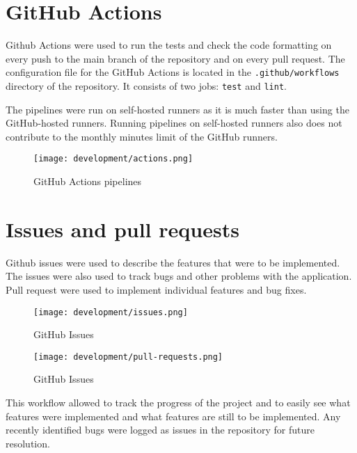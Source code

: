 \documentclass[../main.tex]{subfiles}
\begin{document}
\section{GitHub Actions}

Github Actions were used to run the tests and check the code formatting on every push to the main branch of the repository and on every pull request.
The configuration file for the GitHub Actions is located in the \texttt{.github/workflows} directory of the repository.
It consists of two jobs: \texttt{test} and \texttt{lint}.

The pipelines were run on self-hosted runners as it is much faster than using the GitHub-hosted runners.
Running pipelines on self-hosted runners also does not contribute to the monthly minutes limit of the GitHub runners.

\begin{figure}[H]
  \centering
  \texttt{[image: development/actions.png]}
  \caption{GitHub Actions pipelines}
\end{figure}

\section{Issues and pull requests}

Github issues were used to describe the features that were to be implemented. The issues were also used to track bugs and other problems with the application.
Pull request were used to implement individual features and bug fixes.

\begin{figure}[H]
  \centering
  \texttt{[image: development/issues.png]}
  \caption{GitHub Issues}
\end{figure}

\begin{figure}[H]
  \centering
  \texttt{[image: development/pull-requests.png]}
  \caption{GitHub Issues}
\end{figure}

This workflow allowed to track the progress of the project and to easily see what features were implemented and what features are still to be implemented.
Any recently identified bugs were logged as issues in the repository for future resolution.
\end{document}
